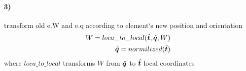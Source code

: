 \paragraph{3)} transform old e.W and e.q according to element`s 
new position and orientation
\begin{eqnarray}
  W = loca\_to\_local( {\hat{\bm{t}}}, {\hat{\bm{q}}}, W ) \\
  {\hat{\bm{q}}} = normilized({\hat{\bm{t}}})
\end{eqnarray}
where $loca\_to\_local$ transforms $W$ from ${\hat{\bm{q}}}$ to 
${\hat{\bm{t}}}$ local coordinates
